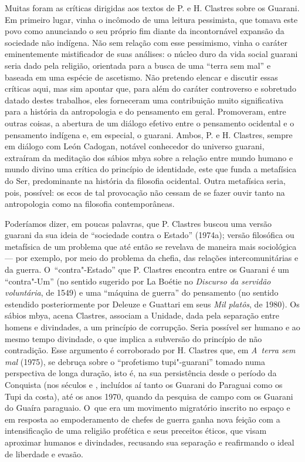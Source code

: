 Muitas foram as críticas dirigidas aos textos de P. e H. Clastres sobre
os Guarani. Em primeiro lugar, vinha o incômodo de uma leitura
pessimista, que tomava este povo como anunciando o seu próprio fim
diante da incontornável expansão da sociedade não indígena. Não sem
relação com esse pessimismo, vinha o caráter eminentemente mistificador
de suas análises: o núcleo duro da vida social guarani seria dado pela
religião, orientada para a busca de uma ``terra sem mal'' e baseada em
uma espécie de ascetismo. Não pretendo elencar e discutir essas
críticas aqui, mas sim apontar que, para além do caráter controverso e
sobretudo datado destes trabalhos, eles forneceram uma contribuição
muito significativa para a história da antropologia e do pensamento em
geral. Promoveram, entre outras coisas, a abertura de um diálogo
efetivo entre o pensamento ocidental e o pensamento indígena e, em
especial, o guarani. Ambos, P. e H. Clastres, sempre em diálogo com
León Cadogan, notável conhecedor do universo guarani, extraíram da
meditação dos sábios mbya sobre a relação entre mundo humano e mundo
divino uma crítica do princípio de identidade, este que funda a
metafísica do Ser, predominante na história da filosofia ocidental.
Outra metafísica seria, pois, possível: os ecos de tal provocação não
cessam de se fazer ouvir tanto na antropologia como na filosofia
contemporâneas.

Poderíamos dizer, em poucas palavras, que P. Clastres buscou uma versão
guarani da sua ideia de ``sociedade contra o Estado'' (1974a); versão
filosófica ou metafísica de um problema que até então se revelava de
maneira mais sociológica --- por exemplo, por meio do problema da chefia,
das relações intercomunitárias e da guerra. O~``contra"-Estado'' que P.
Clastres encontra entre os Guarani é um ``contra"-Um'' (no sentido
sugerido por La Boétie no \emph{Discurso da servidão voluntária}, de 1549) e
uma ``máquina de guerra'' do pensamento (no sentido estendido
posteriormente por Deleuze e Guattari em seus \emph{Mil platôs}, de 1980). Os
sábios mbya, acena Clastres, associam a Unidade, dada pela separação
entre homens e divindades, a um princípio de corrupção. Seria possível
ser humano e ao mesmo tempo divindade, o que implica a subversão do
princípio de não contradição. Esse argumento é corroborado por H.
Clastres que, em \emph{A~terra sem mal} (1975), se debruça sobre o ``profetismo
tupi"-guarani'' tomado numa perspectiva de longa duração, isto é, na sua
persistência desde o período da Conquista (nos séculos  e ,
incluídos aí tanto os Guarani do Paraguai como os Tupi da costa), até
os anos 1970, quando da pesquisa de campo com os Guarani do Guaíra
paraguaio. O~que era um movimento migratório inscrito no espaço e em
resposta ao empoderamento de chefes de guerra ganha nova feição com a
intensificação de uma religião profética e seus preceitos éticos, que
visam aproximar humanos e divindades, recusando sua separação e
reafirmando o ideal de liberdade e evasão.

